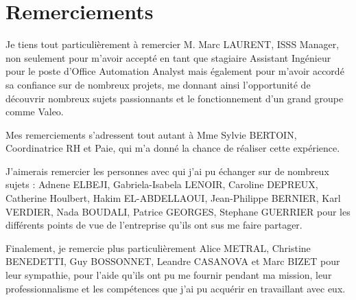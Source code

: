 \chapter*{Remerciements}


Je tiens tout particulièrement à remercier M. Marc LAURENT, ISSS Manager, non seulement pour m’avoir accepté en tant que stagiaire Assistant Ingénieur pour le poste d'Office Automation Analyst mais également pour m’avoir accordé sa confiance sur de nombreux projets, me donnant ainsi l’opportunité de découvrir nombreux sujets passionnants et le fonctionnement d'un grand groupe comme Valeo. 

Mes remerciements s’adressent tout autant à Mme Sylvie BERTOIN, 
Coordinatrice RH et Paie, qui m’a donné la chance de 
réaliser cette expérience. 

J’aimerais remercier les personnes avec qui j'ai pu échanger sur de nombreux sujets : Adnene ELBEJI, Gabriela-Isabela LENOIR, Caroline DEPREUX, Catherine Houlbert, Hakim EL-ABDELLAOUI, Jean-Philippe BERNIER, Karl VERDIER, Nada BOUDALI, Patrice GEORGES, Stephane GUERRIER pour les différents points de vue de l’entreprise qu’ils ont sus me faire partager. 

Finalement, je remercie plus particulièrement Alice METRAL, Christine BENEDETTI, Guy BOSSONNET, Leandre CASANOVA et Marc BIZET pour leur sympathie, pour l’aide qu’ils ont pu me fournir pendant ma mission, leur professionnalisme et les compétences que j’ai pu acquérir en travaillant avec eux.

